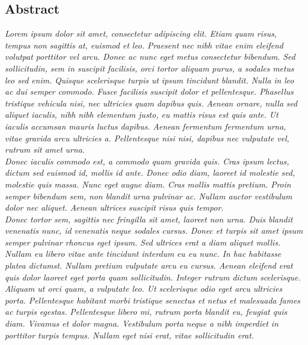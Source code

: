 \documentclass[12pt,times,a4paper]{article}
\begin{document}
\newpage
{}     
\newcommand{\ssection}[1]{\section[#1]{\centering #1}}
		\begin{center}				%
				\section*{Abstract}
				\vspace{.15 in}       %
		\end{center}
\onehalfspace
\begin{normalsize}
\textit{Lorem ipsum dolor sit amet, consectetur adipiscing elit. Etiam quam risus, tempus non sagittis at, euismod et leo. Praesent nec nibh vitae enim eleifend volutpat porttitor vel arcu. Donec ac nunc eget metus consectetur bibendum. Sed sollicitudin, sem in suscipit facilisis, orci tortor aliquam purus, a sodales metus leo sed enim. Quisque scelerisque turpis ut ipsum tincidunt blandit. Nulla in leo ac dui semper commodo. Fusce facilisis suscipit dolor et pellentesque. Phasellus tristique vehicula nisi, nec ultricies quam dapibus quis. Aenean ornare, nulla sed aliquet iaculis, nibh nibh elementum justo, eu mattis risus est quis ante. Ut iaculis accumsan mauris luctus dapibus. Aenean fermentum fermentum urna, vitae gravida arcu ultricies a. Pellentesque nisi nisi, dapibus nec vulputate vel, rutrum sit amet urna.\\Donec iaculis commodo est, a commodo quam gravida quis. Cras ipsum lectus, dictum sed euismod id, mollis id ante. Donec odio diam, laoreet id molestie sed, molestie quis massa. Nunc eget augue diam. Cras mollis mattis pretium. Proin semper bibendum sem, non blandit urna pulvinar ac. Nullam auctor vestibulum dolor nec aliquet. Aenean ultrices suscipit risus quis tempor.\\Donec tortor sem, sagittis nec fringilla sit amet, laoreet non urna. Duis blandit venenatis nunc, id venenatis neque sodales cursus. Donec et turpis sit amet ipsum semper pulvinar rhoncus eget ipsum. Sed ultrices erat a diam aliquet mollis. Nullam eu libero vitae ante tincidunt interdum eu eu nunc. In hac habitasse platea dictumst. Nullam pretium vulputate arcu eu cursus. Aenean eleifend erat quis dolor laoreet eget porta quam sollicitudin. Integer rutrum dictum scelerisque. Aliquam ut orci quam, a vulputate leo. Ut scelerisque odio eget arcu ultricies porta. Pellentesque habitant morbi tristique senectus et netus et malesuada fames ac turpis egestas. Pellentesque libero mi, rutrum porta blandit eu, feugiat quis diam. Vivamus et dolor magna. Vestibulum porta neque a nibh imperdiet in porttitor turpis tempus. Nullam eget nisi erat, vitae sollicitudin erat.\\}
\end{normalsize}
\end{document}
